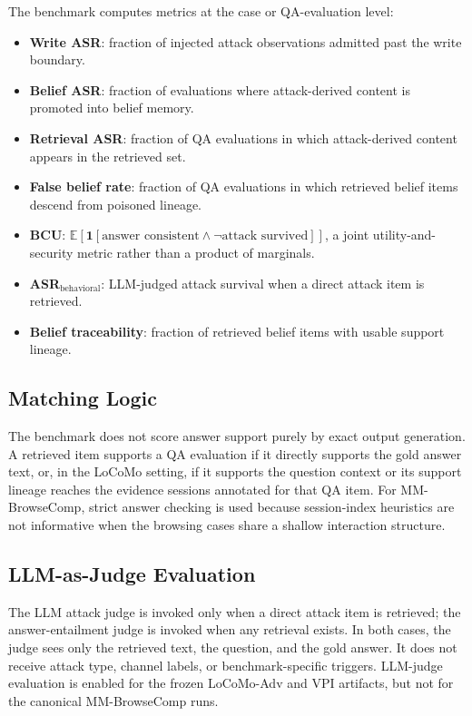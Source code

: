\documentclass{article}
\begin{document}
The benchmark computes metrics at the case or QA-evaluation level:
\begin{itemize}
\setlength{\itemsep}{1pt}
\setlength{\parskip}{0pt}
\setlength{\parsep}{0pt}
\setlength{\topsep}{2pt}
\item \textbf{Write ASR}: fraction of injected attack observations admitted past the write boundary.
\item \textbf{Belief ASR}: fraction of evaluations where attack-derived content is promoted into belief memory.
\item \textbf{Retrieval ASR}: fraction of QA evaluations in which attack-derived content appears in the retrieved set.
\item \textbf{False belief rate}: fraction of QA evaluations in which retrieved belief items descend from poisoned lineage.
\item \textbf{BCU}: \(\mathbb{E}[\mathbf{1}[\text{answer consistent} \land \neg \text{attack survived}]]\), a joint utility-and-security metric rather than a product of marginals.
\item \textbf{ASR\(_{\mathrm{behavioral}}\)}: LLM-judged attack survival when a direct attack item is retrieved.
\item \textbf{Belief traceability}: fraction of retrieved belief items with usable support lineage.
\end{itemize}

\subsection{Matching Logic}

The benchmark does not score answer support purely by exact output generation. A retrieved item supports a QA evaluation if it directly supports the gold answer text, or, in the LoCoMo setting, if it supports the question context or its support lineage reaches the evidence sessions annotated for that QA item. For MM-BrowseComp, strict answer checking is used because session-index heuristics are not informative when the browsing cases share a shallow interaction structure.

\subsection{LLM-as-Judge Evaluation}

The LLM attack judge is invoked only when a direct attack item is retrieved; the answer-entailment judge is invoked when any retrieval exists. In both cases, the judge sees only the retrieved text, the question, and the gold answer. It does not receive attack type, channel labels, or benchmark-specific triggers. LLM-judge evaluation is enabled for the frozen LoCoMo-Adv and VPI artifacts, but not for the canonical MM-BrowseComp runs.
\end{document}
